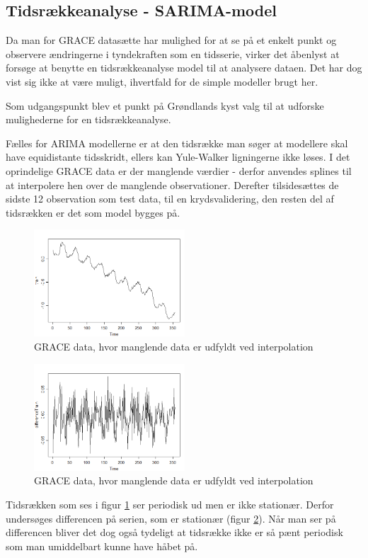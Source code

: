 
\subsection{Tidsrækkeanalyse - SARIMA-model}

Da man for GRACE datasætte har mulighed for at se på et enkelt punkt og observere ændringerne i tyndekraften som en tidsserie,
virker det åbenlyst at forsøge at benytte en tidsrækkeanalyse model til at analysere dataen.
Det har dog vist sig ikke at være muligt, ihvertfald for de simple modeller brugt her.

Som udgangspunkt blev et punkt på Grøndlands kyst  valg til at udforske mulighederne for en tidsrækkeanalyse.

Fælles for ARIMA modellerne er at den tidsrække man søger at modellere skal have equidistante tidsskridt,
ellers kan Yule-Walker ligningerne \cite[s.~122]{time-series-analysis} ikke løses.
I det oprindelige GRACE data er der manglende værdier - derfor anvendes splines 
til at interpolere hen over de manglende observationer. Derefter tilsidesættes de sidste 12 observation som test data, til en krydsvalidering,
den resten del af tidsrækken er det som model bygges på.

\begin{figure}[H]
\centering
\includegraphics[height=4cm]{figures/yTrain}
\caption{GRACE data, hvor manglende data er udfyldt ved interpolation}
\label{fig:ts-y-train-raw}
\end{figure}

\begin{figure}[H]
\centering
\includegraphics[height=4cm]{figures/differenceYTrain}
\caption{GRACE data, hvor manglende data er udfyldt ved interpolation}
\label{fig:ts-y-train-diff}
\end{figure}
Tidsrækken som ses i figur \ref{fig:ts-y-train-raw} ser periodisk ud men er ikke stationær.
Derfor undersøges differencen på serien, som er stationær (figur \ref{fig:ts-y-train-diff}).
Når man ser på differencen bliver det dog også tydeligt at tidsrække ikke er så pænt periodisk som man umiddelbart kunne have håbet på.

